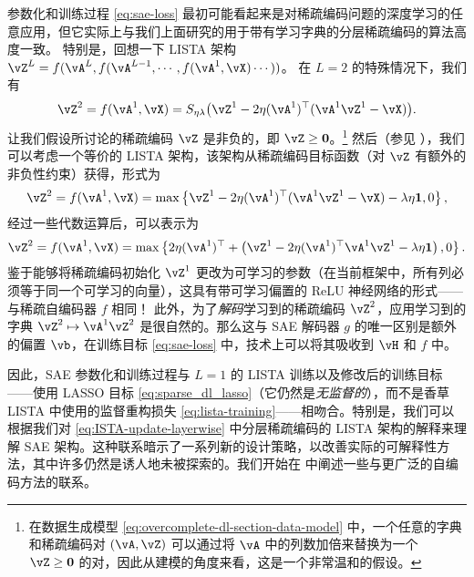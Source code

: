 \documentclass[../../book-main_zh.tex]{subfiles}
\begin{document}
参数化和训练过程 \eqref{eq:sae-loss} 最初可能看起来是对稀疏编码问题的深度学习的任意应用，但它实际上与我们上面研究的用于带有学习字典的分层稀疏编码的算法高度一致。
特别是，回想一下 LISTA %
架构 $\vZ^{L} = f(\vA^L, f(\vA^{L-1}, \cdots, f(\vA^1, \vX) \cdots ))$。
在 $L=2$ 的特殊情况下，我们有
\begin{equation}
    \vZ^2 = f(\vA^1, \vX) 
    =S_{\eta\lambda}\rp{\vZ^{1} - 2\eta(\vA^{1})^{\top}(\vA^1\vZ^{1} - \vX)}.
\end{equation}
让我们假设所讨论的稀疏编码 $\vZ$ 是非负的，即 $\vZ \geq \Zero$。\footnote{在数据生成模型 \eqref{eq:overcomplete-dl-section-data-model} 中，一个任意的字典和稀疏编码对 $(\vA, \vZ)$ 可以通过将 $\vA$ 中的列数加倍来替换为一个 $\vZ \geq \Zero$ 的对，因此从建模的角度来看，这是一个非常温和的假设。}
然后（参见 ），我们可以考虑一个等价的 LISTA 架构，该架构从稀疏编码目标函数（对 $\vZ$ 有额外的非负性约束）获得，形式为
\begin{equation}
    \vZ^2 = f(\vA^1, \vX) 
    =\max \set*{\vZ^{1} - 2\eta(\vA^{1})^{\top}(\vA^1\vZ^{1} - \vX)
    - \lambda\eta \mathbf{1}, 0},
\end{equation}
经过一些代数运算后，可以表示为
\begin{equation}
    \vZ^2 = f(\vA^1, \vX) 
    =\max \set*{
        2\eta(\vA^{1})^{\top}
        +
        \left(
        \vZ^{1} - 2\eta(\vA^{1})^{\top}\vA^1\vZ^{1} - \lambda\eta \mathbf{1}
        \right), 0
    }.
\end{equation}
鉴于能够将稀疏编码初始化 $\vZ^1$ 更改为可学习的参数（在当前框架中，所有列必须等于同一个可学习的向量），这具有带可学习偏置的 ReLU 神经网络的形式——与稀疏自编码器 $f$ 相同！
此外，为了\textit{解码}学习到的稀疏编码 $\vZ^2$，应用学习到的字典 $\vZ^2 \mapsto \vA^1 \vZ^2$ 是很自然的。那么这与 SAE 解码器 $g$ 的唯一区别是额外的偏置 $\vb$，在训练目标 \eqref{eq:sae-loss} 中，技术上可以将其吸收到 $\vH$ 和 $f$ 中。

因此，SAE 参数化和训练过程与 $L=1$ 的 LISTA 训练以及修改后的训练目标——使用 LASSO 目标 \eqref{eq:sparse_dl_lasso}（它仍然是\textit{无监督的}），而不是香草 LISTA 中使用的监督重构损失 \eqref{eq:lista-training}——相吻合。特别是，我们可以根据我们对 \eqref{eq:ISTA-update-layerwise} 中分层稀疏编码的 LISTA 架构的解释来理解 SAE 架构。这种联系暗示了一系列新的设计策略，以改善实际的可解释性方法，其中许多仍然是诱人地未被探索的。我们开始在  中阐述一些与更广泛的自编码方法的联系。
\end{document}
